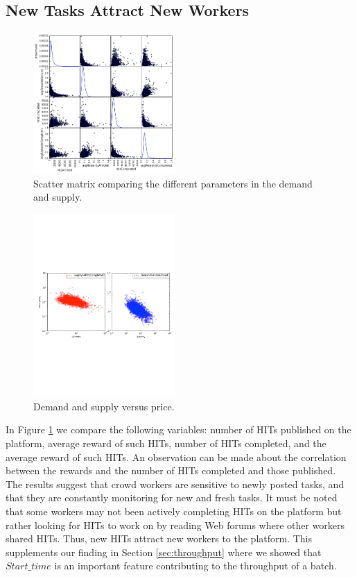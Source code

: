 \subsection{New Tasks Attract New Workers}
\begin{figure}[tb]
	\centering
		\includegraphics[width=0.48\textwidth]{figures/scattermatrix}
	\caption{Scatter matrix comparing the different parameters in the demand and supply.}
	\label{fig:scatter_matrix}
\end{figure}
\begin{figure}[tb]
	\centering
		\includegraphics[width=0.48\textwidth]{figures/supply_demand}
	\caption{Demand and supply versus price.}
	\label{fig:dsup}
\end{figure}
In Figure \ref{fig:scatter_matrix} we compare  the following variables: number of HITs published on the platform, average reward of such HITs, number of HITs completed, and the average reward of such HITs. An observation  can be made about the correlation between the rewards and the number of HITs completed and those published.
The results suggest that crowd workers are sensitive to newly posted tasks, and that they are constantly monitoring for new and fresh tasks.
It must be noted that some workers may not been actively completing HITs on the platform but rather looking for HITs to work on by reading Web forums where other workers shared HITs. Thus, new HITs attract new workers to the platform.
This supplements our finding in Section \ref{sec:throughput} where we showed that $Start\_time$ is an important feature contributing to the throughput of a batch.

